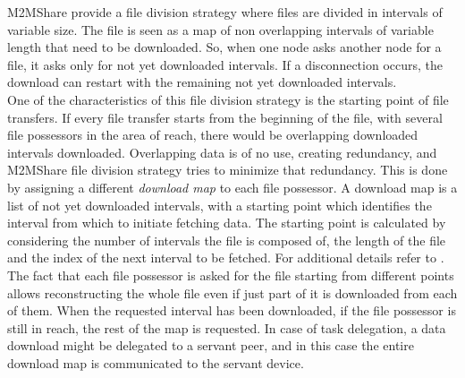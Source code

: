 M2MShare provide a file division strategy where files are divided in intervals of variable size. The file is seen as a map of non overlapping intervals of variable length that need to be downloaded. So, when one node asks another node for a file, it asks only for not yet downloaded intervals. If a disconnection occurs, the download can restart with the remaining not yet downloaded intervals.
\\

One of the characteristics of this file division strategy is the starting point of file transfers. If every file transfer starts from the beginning of the file, with several file possessors in the area of reach, there would be overlapping downloaded intervals downloaded. Overlapping data is of no use, creating redundancy, and M2MShare file division strategy tries to minimize that redundancy. This is done by assigning a different \textit{download map} to each file possessor. A download map is a list of not yet downloaded intervals, with a starting point which identifies the interval from which to initiate fetching data. The starting point is calculated by considering the number of intervals the file is composed of, the length of the file and the index of the next interval to be fetched. For additional details refer to \cite{tesiarmir}.
\\

The fact that each file possessor is asked for the file starting from different points allows reconstructing the whole file even if just part of it is downloaded from each of them. When the requested interval has been downloaded, if the file possessor is still in reach, the rest of the map is requested. In case of task delegation, a data download might be delegated to a servant peer, and in this case the entire download map is communicated to the servant device.
 
 

